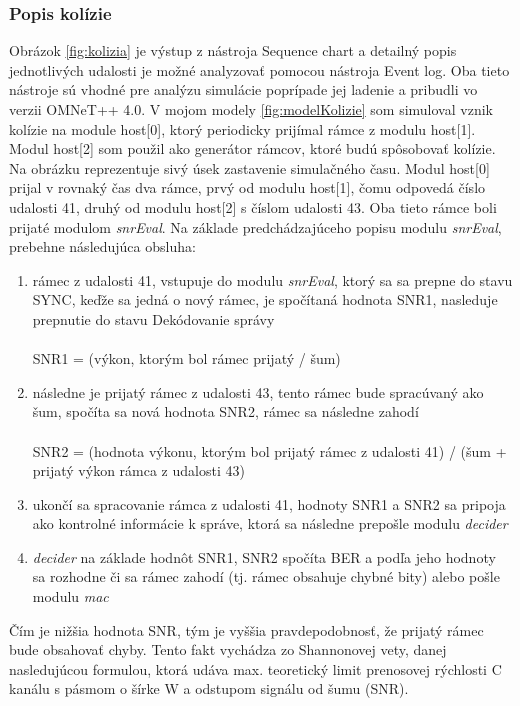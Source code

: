 \documentclass[11pt,twoside,a4paper]{book}
\begin{document}
\subsubsection{Popis kolízie}
Obrázok \ref{fig:kolizia} je výstup z nástroja Sequence chart a detailný popis jednotlivých udalosti je možné analyzovať pomocou nástroja Event log. Oba tieto nástroje sú vhodné pre analýzu simulácie poprípade jej ladenie a pribudli vo verzii OMNeT++ 4.0. V mojom modely \ref{fig:modelKolizie} som simuloval vznik kolízie na module host[0], ktorý periodicky prijímal rámce z modulu host[1]. Modul host[2] som použil ako generátor rámcov, ktoré budú spôsobovať kolízie. Na obrázku reprezentuje sivý úsek zastavenie simulačného času. Modul host[0] prijal v rovnaký čas dva rámce, prvý od modulu host[1], čomu odpovedá číslo udalosti 41, druhý od modulu host[2] s číslom udalosti 43. Oba tieto rámce boli prijaté modulom \textit{snrEval}. Na základe predchádzajúceho popisu modulu \textit{snrEval}, prebehne následujúca obsluha:
\begin{enumerate}
 \item rámec z udalosti 41, vstupuje do modulu \textit{snrEval}, ktorý sa sa prepne do stavu SYNC, keďže sa jedná o nový rámec, je spočítaná hodnota SNR1, nasleduje prepnutie do stavu Dekódovanie správy \\ \\
 SNR1 = (výkon, ktorým bol rámec prijatý / šum)
 \item následne je prijatý rámec z udalosti 43, tento rámec bude spracúvaný ako šum, spočíta sa nová hodnota SNR2, rámec sa následne zahodí \\ \\
 SNR2 = (hodnota výkonu, ktorým bol prijatý rámec z udalosti 41) / (šum + prijatý výkon rámca z udalosti 43)
 \item ukončí sa spracovanie rámca z udalosti 41, hodnoty SNR1 a SNR2 sa pripoja ako kontrolné informácie k správe, ktorá sa následne prepošle modulu \textit{decider}
 \item \textit{decider} na základe hodnôt SNR1, SNR2 spočíta BER a podľa jeho hodnoty sa rozhodne či sa rámec zahodí (tj. rámec obsahuje chybné bity) alebo pošle modulu \textit{mac}
\end{enumerate}

Čím je nižšia hodnota SNR, tým je vyššia pravdepodobnosť, že prijatý rámec bude obsahovať chyby. Tento fakt vychádza zo Shannonovej vety, danej nasledujúcou formulou, ktorá udáva max. teoretický limit prenosovej rýchlosti C kanálu s pásmom o šírke W a odstupom signálu od šumu (SNR).
\end{document}
